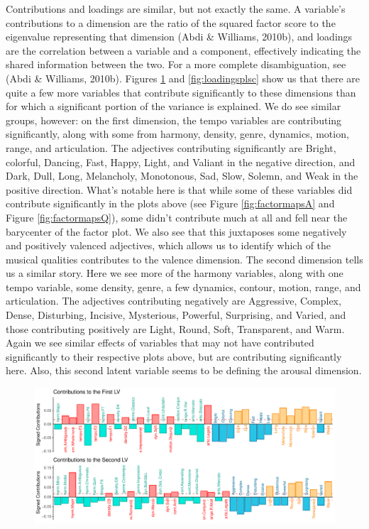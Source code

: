 \documentclass[
  english,
  man,floatsintext]{apa6}
\begin{document}
Contributions and loadings are similar, but not exactly the same. A variable's contributions to a dimension are the ratio of the squared factor score to the eigenvalue representing that dimension (Abdi \& Williams, 2010b), and loadings are the correlation between a variable and a component, effectively indicating the shared information between the two. For a more complete disambiguation, see (Abdi \& Williams, 2010b). Figures \ref{fig:contsplsc} and \ref{fig:loadingsplsc} show us that there are quite a few more variables that contribute significantly to these dimensions than for which a significant portion of the variance is explained. We do see similar groups, however: on the first dimension, the tempo variables are contributing significantly, along with some from harmony, density, genre, dynamics, motion, range, and articulation. The adjectives contributing significantly are Bright, colorful, Dancing, Fast, Happy, Light, and Valiant in the negative direction, and Dark, Dull, Long, Melancholy, Monotonous, Sad, Slow, Solemn, and Weak in the positive direction. What's notable here is that while some of these variables did contribute significantly in the plots above (see Figure \ref{fig:factormapsA} and Figure \ref{fig:factormapsQ}), some didn't contribute much at all and fell near the barycenter of the factor plot. We also see that this juxtaposes some negatively and positively valenced adjectives, which allows us to identify which of the musical qualities contributes to the valence dimension.
The second dimension tells us a similar story. Here we see more of the harmony variables, along with one tempo variable, some density, genre, a few dynamics, contour, motion, range, and articulation. The adjectives contributing negatively are Aggressive, Complex, Dense, Disturbing, Incisive, Mysterious, Powerful, Surprising, and Varied, and those contributing positively are Light, Round, Soft, Transparent, and Warm. Again we see similar effects of variables that may not have contributed significantly to their respective plots above, but are contributing significantly here. Also, this second latent variable seems to be defining the arousal dimension.\\

\begin{figure}

{\centering \includegraphics{Music-Descriptor-Space_files/figure-latex/contsplsc-1} 

}

\caption{ }\label{fig:contsplsc}
\end{figure}
\end{document}
